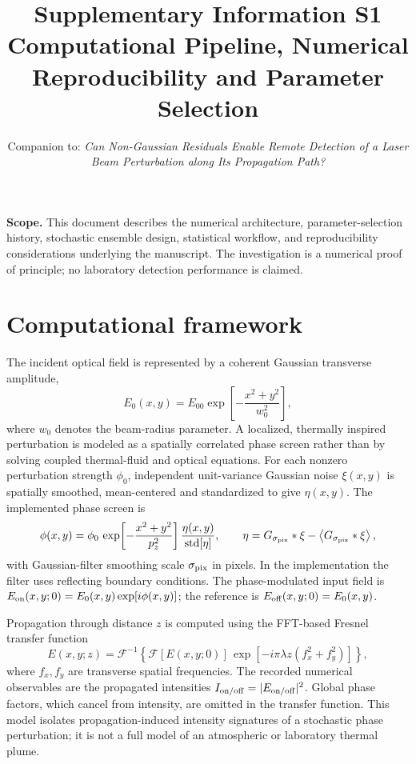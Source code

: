 \documentclass[11pt,a4paper]{article}
\title{\bfseries Supplementary Information S1\\[4pt]\large Computational Pipeline, Numerical Reproducibility and Parameter Selection}
\author{\parbox{0.92\textwidth}{\centering\small Companion to: \emph{Can Non-Gaussian Residuals Enable Remote Detection of a Laser Beam Perturbation along Its Propagation Path?}}}
\date{}
\begin{document}
\maketitle
\noindent\textbf{Scope.} This document describes the numerical architecture, parameter-selection history, stochastic ensemble design, statistical workflow, and reproducibility considerations underlying the manuscript. The investigation is a numerical proof of principle; no laboratory detection performance is claimed.

\section{Computational framework}
The incident optical field is represented by a coherent Gaussian transverse amplitude,
\begin{equation}
 E_0(x,y)=E_{00}\exp\!\left[-\frac{x^2+y^2}{w_0^2}\right],
 \label{eq:input}
\end{equation}
where $w_0$ denotes the beam-radius parameter. A localized, thermally inspired perturbation is modeled as a spatially correlated phase screen rather than by solving coupled thermal-fluid and optical equations. For each nonzero perturbation strength $\phi_0$, independent unit-variance Gaussian noise $\xi(x,y)$ is spatially smoothed, mean-centered and standardized to give $\eta(x,y)$. The implemented phase screen is
\begin{equation}
 \phi(x,y)=\phi_0\,\exp\!\left[-\frac{x^2+y^2}{p_z^2}\right]
 \frac{\eta(x,y)}{\operatorname{std}[\eta]},\qquad
 \eta=G_{\sigma_{\rm pix}}*\xi-\left\langle G_{\sigma_{\rm pix}}*\xi\right\rangle,
 \label{eq:screen}
\end{equation}
with Gaussian-filter smoothing scale $\sigma_{\rm pix}$ in pixels. In the implementation the filter uses reflecting boundary conditions. The phase-modulated input field is $E_{\rm on}(x,y;0)=E_0(x,y)\exp[i\phi(x,y)]$; the reference is $E_{\rm off}(x,y;0)=E_0(x,y)$.

Propagation through distance $z$ is computed using the FFT-based Fresnel transfer function
\begin{equation}
 E(x,y;z)=\mathcal{F}^{-1}\!\left\{\mathcal{F}[E(x,y;0)]\,
 \exp\left[-i\pi\lambda z(f_x^2+f_y^2)\right]\right\},
 \label{eq:fresnel}
\end{equation}
where $f_x,f_y$ are transverse spatial frequencies. The recorded numerical observables are the propagated intensities $I_{\rm on/off}=|E_{\rm on/off}|^2$. Global phase factors, which cancel from intensity, are omitted in the transfer function. This model isolates propagation-induced intensity signatures of a stochastic phase perturbation; it is not a full model of an atmospheric or laboratory thermal plume.
\end{document}
